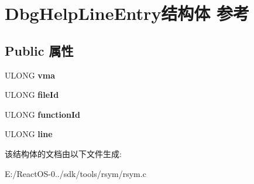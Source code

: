 \hypertarget{struct_dbg_help_line_entry}{}\section{Dbg\+Help\+Line\+Entry结构体 参考}
\label{struct_dbg_help_line_entry}
\subsection*{Public 属性}
\begin{DoxyCompactItemize}
\item 
\mbox{\label{struct_dbg_help_line_entry_a55b24f081f854424cf617a1888e3f15a}} 
U\+L\+O\+NG {\bfseries vma}
\item 
\mbox{\label{struct_dbg_help_line_entry_ac43999cceba4b8ee1dfab1d7049cbb48}} 
U\+L\+O\+NG {\bfseries file\+Id}
\item 
\mbox{\label{struct_dbg_help_line_entry_a64a19dd86d8e8e43cc8d05471ff7af58}} 
U\+L\+O\+NG {\bfseries function\+Id}
\item 
\mbox{\label{struct_dbg_help_line_entry_af336988434df5e4b0153828a6729d53b}} 
U\+L\+O\+NG {\bfseries line}
\end{DoxyCompactItemize}


该结构体的文档由以下文件生成\+:\begin{DoxyCompactItemize}
\item 
E\+:/\+React\+O\+S-\/0../sdk/tools/rsym/rsym.\+c\end{DoxyCompactItemize}
